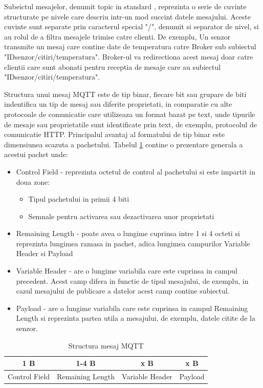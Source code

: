 Subeictul mesajelor, denumit topic in standard \cite{mqttstandard}, reprezinta o serie de cuvinte structurate pe nivele care descriu intr-un mod succint datele mesajului. 
Aceste cuvinte sunt separate prin caracterul special "/", denumit si separator de nivel, si au rolul de a filtra mesajele trimise catre clienti. 
De exemplu, Un senzor transmite un mesaj care contine date de temperatura catre Broker sub subiectul "IDsenzor/citiri/temperatura". 
Broker-ul va redirectiona acest mesaj doar catre clientii care sunt abonati pentru receptia de mesaje care au subiectul "IDsenzor/citiri/temperatura".

Structura unui mesaj MQTT este de tip binar, fiecare bit sau grupare de biti indentifica un tip de mesaj sau diferite proprietati, in comparatie cu alte 
protocoale de comunicatie care utilizeaza un format bazat pe text, unde tipurile de mesaje sau proprietatile sunt identificate prin text, de exemplu,
protocolul de comunicatie HTTP. Principalul avantaj al formatului de tip binar este dimensiunea scazuta a pachetului. Tabelul \ref{tab:StructuraMesajMQTT} 
contine o prezentare generala a acestui pachet unde:
\begin{itemize}
	\item Control Field - reprezinta octetul de control al pachetului si este impartit in doua zone:
    \begin{itemize}
        \item Tipul pachetului in primii 4 biti
        \item Semnale pentru activarea sau dezactivarea unor proprietati
    \end{itemize}
	\item Remaining Length - poate avea o lungime cuprinsa intre 1 si 4 octeti si reprezinta lungimea ramasa in pachet, adica lungimea campurilor Variable Header 
    si Payload
	\item Variable Header - are o lungime variabila care este cuprinsa in campul precedent. Acest camp difera in functie de tipul mesajului, de exemplu, in 
	cazul mesajului de publicare a datelor acest camp contine subiectul.
	\item Payload - are o lungime variabila care este cuprinsa in campul Remaining Length si reprezinta partea utila a mesajului, de exemplu, datele citite de 
	la senzor.
\end{itemize}

\begin{table}[ht]
    \caption{Structura mesaj MQTT}
    \centering                          %
    \begin{tabular}{|c|c|c|c|}          %
        \hline
        1 B & 1-4 B & x B & x B \\ [0.5ex]   %
        \hline                              %
        Control Field & Remaining Length & Variable Header & Payload \\               %
        \hline
    \end{tabular}
    \label{tab:StructuraMesajMQTT}                %
\end{table}

